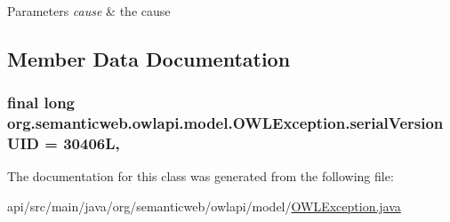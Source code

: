 \begin{DoxyParams}{Parameters}
{\em cause} & the cause \\
\hline
\end{DoxyParams}


\subsection{Member Data Documentation}
\hypertarget{classorg_1_1semanticweb_1_1owlapi_1_1model_1_1_o_w_l_exception_af00537c310cc7e91f08446c29b6927e6}{
\subsubsection[{serial\-Version\-U\-I\-D}]{\setlength{\rightskip}{0pt plus 5cm}final long org.\-semanticweb.\-owlapi.\-model.\-O\-W\-L\-Exception.\-serial\-Version\-U\-I\-D = 30406\-L\hspace{0.3cm}{\ttfamily [static]}, {\ttfamily [private]}}}\label{classorg_1_1semanticweb_1_1owlapi_1_1model_1_1_o_w_l_exception_af00537c310cc7e91f08446c29b6927e6}


The documentation for this class was generated from the following file\-:\begin{DoxyCompactItemize}
\item 
api/src/main/java/org/semanticweb/owlapi/model/\hyperlink{_o_w_l_exception_8java}{O\-W\-L\-Exception.\-java}\end{DoxyCompactItemize}
